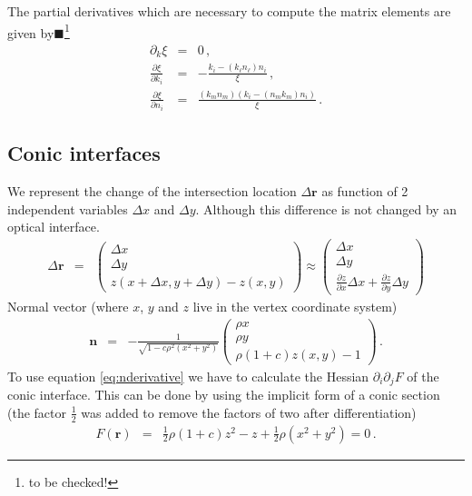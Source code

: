 \documentclass[12pt,a4paper,twoside,openright,BCOR10mm,headsepline,titlepage,abstracton,chapterprefix,final]{scrreprt}
\newcommand\Vector[1]{{\mathbf{#1}}}
\newcommand{\remark}[1]{{\color{red}$\blacksquare$}\footnote{{\color{red}#1}}}
\begin{document}
The partial derivatives which are necessary to compute the matrix elements are given by\remark{to be checked!}
\begin{eqnarray}
 \partial_k \xi &=& 0\,,\\
 \frac{\partial \xi}{\partial k_i} &=& -\frac{k_i - (k_\ell n_\ell) n_i}{\xi}\,,\\
 \frac{\partial \xi}{\partial n_i} &=& \frac{(k_m n_m) (k_i - (n_m k_m) n_i)}{\xi}\,.
\end{eqnarray}


\subsection{Conic interfaces}

We represent the change of the intersection location $\Delta\Vector{r}$ as function of 2 independent variables $\Delta x$ and $\Delta y$.
Although this difference is not changed by an optical interface.
\begin{eqnarray}
 \Delta\Vector{r} &=&
 \begin{pmatrix}
  \Delta x \\ \Delta y \\ z(x+\Delta x,y+\Delta y) - z(x,y)
 \end{pmatrix}
 \approx 
 \begin{pmatrix}
  \Delta x \\ \Delta y \\ \frac{\partial z}{\partial x} \Delta x + \frac{\partial z}{\partial y} \Delta y
 \end{pmatrix}
\end{eqnarray}
Normal vector (where $x$, $y$ and $z$ live in the vertex coordinate system)
\begin{eqnarray}
 \Vector{n} &=&- \frac{1}{\sqrt{ 1 - c \rho^2 (x^2 + y^2)}} 
  \begin{pmatrix}
   \rho x \\
   \rho y \\
   \rho ( 1 + c ) z(x,y) - 1
  \end{pmatrix}\,.
\end{eqnarray}
To use equation \eqref{eq:nderivative} we have to calculate the Hessian $\partial_i \partial_j F$ of the conic interface.
This can be done by using the implicit form of a conic section (the factor $\tfrac{1}{2}$ was added to remove the factors of two after
differentiation)
\begin{eqnarray}
 F(\Vector{r}) &=& \frac{1}{2}\rho (1+c) z^2 - z + \frac{1}{2} \rho(x^2 + y^2) = 0\,.
\end{eqnarray}
\end{document}
